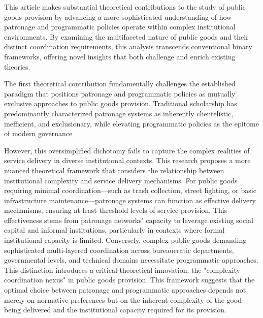 This article makes substantial theoretical contributions to the study of public goods provision by advancing a more sophisticated understanding of how patronage and programmatic policies operate within complex institutional environments. By examining the multifaceted nature of public goods and their distinct coordination requirements, this analysis transcends conventional binary frameworks, offering novel insights that both challenge and enrich existing theories. 



\vspace{3mm}
The first theoretical contribution fundamentally challenges the established paradigm that positions patronage and programmatic policies as mutually exclusive approaches to public goods provision. Traditional scholarship has predominantly characterized patronage systems as inherently clientelistic, inefficient, and exclusionary, while elevating programmatic policies as the epitome of modern governance \citep{kitschelt_patrons_2007}

However, this oversimplified dichotomy fails to capture the complex realities of service delivery in diverse institutional contexts. This research proposes a more nuanced theoretical framework that considers the relationship between institutional complexity and service delivery mechanisms. For public goods requiring minimal coordination—such as trash collection, street lighting, or basic infrastructure maintenance—patronage systems can function as effective delivery mechanisms, ensuring at least threshold levels of service provision. This effectiveness stems from patronage networks' capacity to leverage existing social capital and informal institutions, particularly in contexts where formal institutional capacity is limited. Conversely, complex public goods demanding sophisticated multi-layered coordination across bureaucratic departments, governmental levels, and technical domains necessitate programmatic approaches. This distinction introduces a critical theoretical innovation: the "complexity-coordination nexus" in public goods provision. This framework suggests that the optimal choice between patronage and programmatic approaches depends not merely on normative preferences but on the inherent complexity of the good being delivered and the institutional capacity required for its provision.

